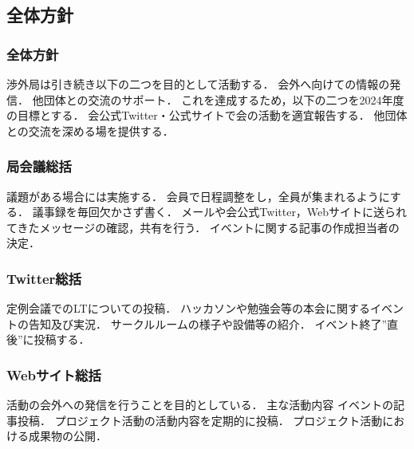\subsection*{全体方針}


\subsubsection*{全体方針}

渉外局は引き続き以下の二つを目的として活動する．
    会外へ向けての情報の発信．
    他団体との交流のサポート．
これを達成するため，以下の二つを2024年度の目標とする．
    会公式Twitter・公式サイトで会の活動を適宜報告する．
    他団体との交流を深める場を提供する．



\subsubsection*{局会議総括}

議題がある場合には実施する．
会員で日程調整をし，全員が集まれるようにする．
議事録を毎回欠かさず書く．
メールや会公式Twitter，Webサイトに送られてきたメッセージの確認，共有を行う．
イベントに関する記事の作成担当者の決定．


\subsubsection*{Twitter総括}

定例会議でのLTについての投稿．
ハッカソンや勉強会等の本会に関するイベントの告知及び実況．
サークルルームの様子や設備等の紹介．
イベント終了”直後”に投稿する．


\subsubsection*{Webサイト総括}

活動の会外への発信を行うことを目的としている．
主な活動内容
    イベントの記事投稿．
    プロジェクト活動の活動内容を定期的に投稿．
    プロジェクト活動における成果物の公開．

